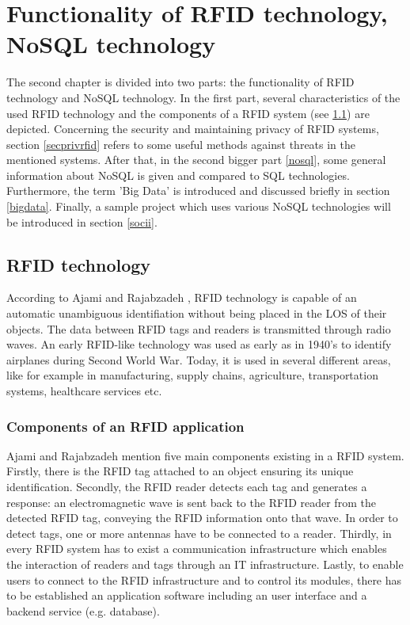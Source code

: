 \chapter{Functionality of RFID technology, NoSQL technology}
\label{Kap2}

The second chapter is divided into two parts: the functionality of RFID technology and NoSQL technology. In the first part, several characteristics of the used RFID technology and the components of a RFID system (see \ref{rfid_technology}) are depicted. Concerning the security and maintaining privacy of RFID systems, section \ref{secprivrfid} refers to some useful methods against threats in the mentioned systems. After that, in the second bigger part \ref{nosql}, some general information about NoSQL is given and compared to SQL technologies. Furthermore, the term 'Big Data' is introduced and discussed briefly in section \ref{bigdata}. Finally, a sample project which uses various NoSQL technologies will be introduced in section \ref{socii}.

\section{RFID technology} \label{rfid_technology}

According to Ajami and Rajabzadeh \cite{ncbi}, RFID technology is capable of an automatic unambiguous identifiation without being placed in the \ac{LOS} of their objects. The data between RFID tags and readers is transmitted through radio waves. An early RFID-like technology was used as early as in 1940's to identify airplanes during Second World War. Today, it is used in several different areas, like for example in manufacturing, supply chains, agriculture, transportation systems, healthcare services etc. 

\subsection{Components of an RFID application} 

Ajami and Rajabzadeh \cite{ncbi} mention five main components existing in a RFID system. Firstly, there is the RFID tag attached to an object ensuring its unique identification. Secondly, the RFID reader detects each tag and generates a response: an electromagnetic wave is sent back to the RFID reader from the detected RFID tag, conveying the RFID information onto that wave. In order to detect tags, one or more antennas have to be connected to a reader. Thirdly, in every RFID system has to exist a communication infrastructure which enables the interaction of readers and tags through an \ac{IT} infrastructure. Lastly, to enable users to connect to the RFID infrastructure and to control its modules, there has to be established an application software including an user interface and a backend service (e.g. database).

